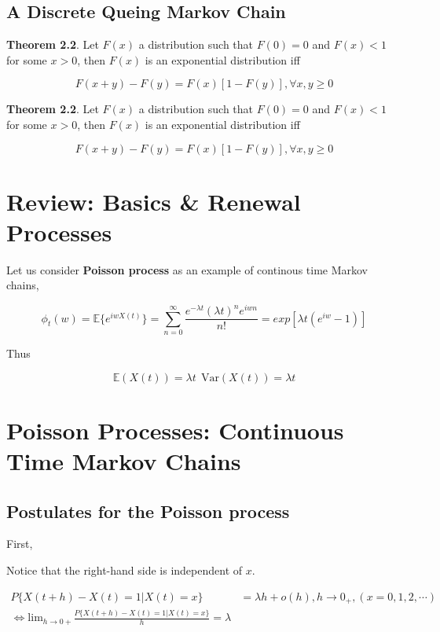 \documentclass[12pt]{article}
\theoremstyle{nonumberbreak}
\begin{document}
\subsection{A Discrete Queing Markov Chain}




\begin{theorem}
\textbf{Theorem 2.2}. Let $F(x)$ a distribution such that $F(0) = 0$ and $F(x) < 1$ for some $x >0 $, then $F(x)$ is an exponential distribution iff

$$
F(x+y) - F(y) = F(x)[1-F(y)], \forall x,y \ge 0
$$
\end{theorem}


\begin{theorem}
\textbf{Theorem 2.2}. Let $F(x)$ a distribution such that $F(0) = 0$ and $F(x) < 1$ for some $x >0 $, then $F(x)$ is an exponential distribution iff

$$
F(x+y) - F(y) = F(x)[1-F(y)], \forall x,y \ge 0
$$
\end{theorem}



\section{Review: Basics \& Renewal Processes}



Let us consider \textbf{Poisson process} as an example of continous time Markov chains,

$$
\phi_t (w) = \mathbb{E} \{ e^{iwX(t)} \} = \sum_{n=0}^\infty \frac{e^{-\lambda t} (\lambda t)^n e^{iwn}}{n!} = exp[\lambda t (e^{iw} -1)]
$$

Thus 

$$
\mathbb{E} (X(t)) = \lambda t \ \ \mathrm{Var}(X(t)) = \lambda t
$$


\section{Poisson Processes: Continuous Time Markov Chains}


\subsection{Postulates for the Poisson process}


First, 

Notice that the right-hand side is independent of $x$. 

$$
\begin{aligned}
P\{ X(t+h) - X(t) = 1 | X(t) = x \} &= \lambda h + o(h), h \to 0_+, (x=0,1,2,\cdots) \\[10pt]
\Leftrightarrow \mathrm{lim}_{h \to 0+} \frac{P\{ X(t+h) - X(t) = 1 | X(t) = x \}}{h} = \lambda
\end{aligned}
$$
\end{document}
